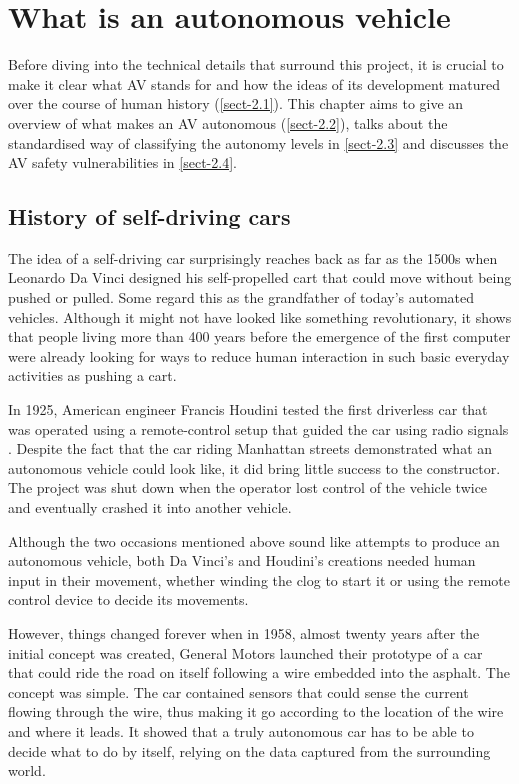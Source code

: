 \chapter{What is an autonomous vehicle} \label{chap:two}
Before diving into the technical details that surround this project, it is crucial to make it clear what AV stands for and how the ideas of its development matured over the course of human history (\autoref{sect-2.1}). This chapter aims to give an overview of what makes an AV autonomous (\autoref{sect-2.2}), talks about the standardised way of classifying the autonomy levels in \autoref{sect-2.3} and discusses the AV safety vulnerabilities in \autoref{sect-2.4}.

\section{History of self-driving cars} \label{sect-2.1}
The idea of a self-driving car surprisingly reaches back as far as the 1500s when Leonardo Da Vinci designed his self-propelled cart \cite{fuller2008did} that could move without being pushed or pulled. Some regard this as the grandfather of today's automated vehicles. Although it might not have looked like something revolutionary, it shows that people living more than 400 years before the emergence of the first computer were already looking for ways to reduce human interaction in such basic everyday activities as pushing a cart.

In 1925, American engineer Francis Houdini tested the first driverless car that was operated using a remote-control setup that guided the car using radio signals \cite{engelking2017driverless}. Despite the fact that the car riding Manhattan streets demonstrated what an autonomous vehicle could look like, it did bring little success to the constructor. The project was shut down when the operator lost control of the vehicle twice and eventually crashed it into another vehicle.

Although the two occasions mentioned above sound like attempts to produce an autonomous vehicle, both Da Vinci's and Houdini's creations needed human input in their movement, whether winding the clog to start it or using the remote control device to decide its movements.

However, things changed forever when in 1958, almost twenty years after the initial concept was created, General Motors launched their prototype of a car that could ride the road on itself following a wire embedded into the asphalt. The concept was simple. The car contained sensors that could sense the current flowing through the wire, thus making it go according to the location of the wire and where it leads. It showed that a truly autonomous car has to be able to decide what to do by itself, relying on the data captured from the surrounding world.

